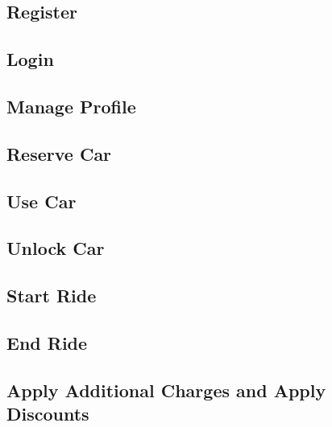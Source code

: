 \subsection{Register}


\subsection{Login}


\subsection{Manage Profile}


\subsection{Reserve Car}


\subsection{Use Car}


\subsection{Unlock Car} \label{unlock_car_section}


\subsection{Start Ride} \label{start_ride_section}


\subsection{End Ride} \label{end_ride_section}


\subsection{Apply Additional Charges and Apply Discounts}



